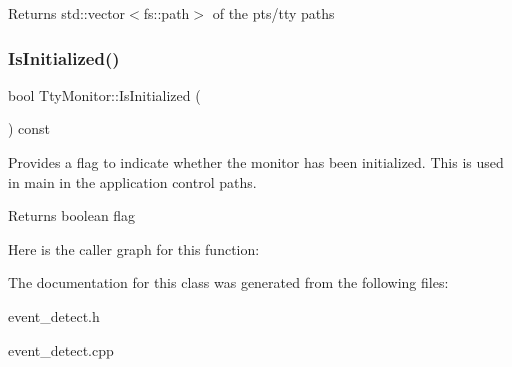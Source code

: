 \begin{DoxyReturn}{Returns}
std\+::vector$<$fs\+::path$>$ of the pts/tty paths 
\end{DoxyReturn}
\mbox{\label{classEventDetect_1_1TtyMonitor_a7a3482d371bfa556a13c9ee11ca1a2c2}} 
\subsubsection{\texorpdfstring{Is\+Initialized()}{IsInitialized()}}
{\footnotesize\ttfamily bool Tty\+Monitor\+::\+Is\+Initialized (\begin{DoxyParamCaption}{ }\end{DoxyParamCaption}) const}



Provides a flag to indicate whether the monitor has been initialized. This is used in main in the application control paths. 

\begin{DoxyReturn}{Returns}
boolean flag 
\end{DoxyReturn}
Here is the caller graph for this function\+:


The documentation for this class was generated from the following files\+:\begin{DoxyCompactItemize}
\item 
event\+\_\+detect.\+h\item 
event\+\_\+detect.\+cpp\end{DoxyCompactItemize}
